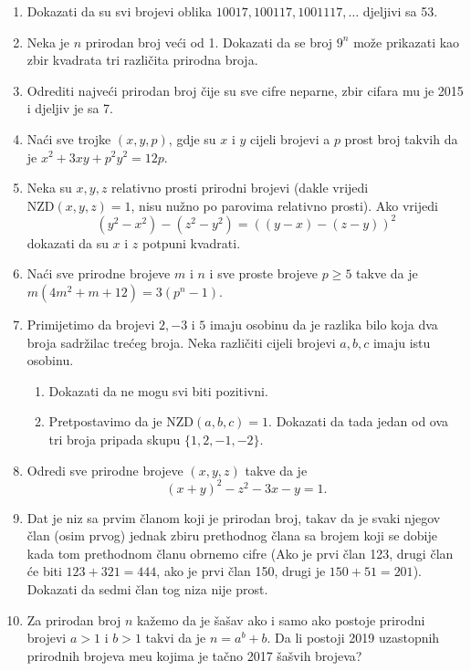 \documentclass{article}
\begin{document}
\begin{enumerate}
    \item Dokazati da su svi brojevi oblika $10017, 100117, 1001117, \ldots$ djeljivi sa 53.

    \item Neka je $n$ prirodan broj ve\'ci od 1. Dokazati da se broj $9^n$ mo\v{z}e prikazati kao zbir kvadrata tri razli\v{c}ita prirodna broja.

    \item Odrediti najve\'ci prirodan broj \v{c}ije su sve cifre neparne, zbir cifara mu je 2015 i djeljiv je sa 7.

    \item Na\'ci sve trojke $(x, y, p)$, gdje su $x$ i $y$ cijeli brojevi a $p$ prost broj takvih da je $x^2 + 3xy + p^2y^2 = 12p$.

    \item Neka su $x, y, z$ relativno prosti prirodni brojevi (dakle vrijedi $\text{NZD}(x, y, z) = 1$, nisu nu\v{z}no po parovima relativno prosti). Ako vrijedi
    \[
    (y^2 - x^2) - (z^2 - y^2) = ((y - x) - (z - y))^2
    \]
    dokazati da su $x$ i $z$ potpuni kvadrati.

    \item Na\'ci sve prirodne brojeve $m$ i $n$ i sve proste brojeve $p \ge 5$ takve da je $m(4m^2 + m + 12) = 3(p^n - 1)$.

    \item Primijetimo da brojevi $2, -3$ i $5$ imaju osobinu da je razlika bilo koja dva broja sadr\v{z}ilac tre\'ceg broja. Neka razli\v{c}iti cijeli brojevi $a, b, c$ imaju istu osobinu.
    \begin{enumerate}
        \item[a)] Dokazati da ne mogu svi biti pozitivni.
        \item[b)] Pretpostavimo da je $\text{NZD}(a, b, c) = 1$. Dokazati da tada jedan od ova tri broja pripada skupu $\{1, 2, -1, -2\}$.
    \end{enumerate}

    \item Odredi sve prirodne brojeve $(x, y, z)$ takve da je
    \[
    (x+y)^2 - z^2 - 3x - y = 1.
    \]

    \item Dat je niz sa prvim \v{c}lanom koji je prirodan broj, takav da je svaki njegov \v{c}lan (osim prvog) jednak zbiru prethodnog \v{c}lana sa brojem koji se dobije kada tom prethodnom \v{c}lanu obrnemo cifre (Ako je prvi \v{c}lan 123, drugi \v{c}lan \'ce biti $123 + 321 = 444$, ako je prvi \v{c}lan 150, drugi je $150 + 51 = 201$). Dokazati da sedmi \v{c}lan tog niza nije prost.

    \item Za prirodan broj $n$ ka\v{z}emo da je \v{s}a\v{s}av ako i samo ako postoje prirodni brojevi $a > 1$ i $b > 1$ takvi da je $n = a^b + b$. Da li postoji 2019 uzastopnih prirodnih brojeva me\dj u kojima je ta\v{c}no 2017 \v{s}a\v{s}vih brojeva?
\end{enumerate}
\end{document}
